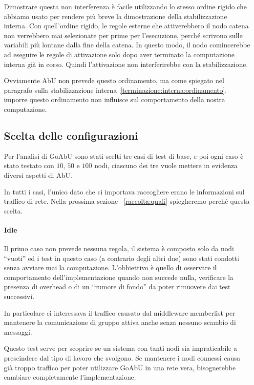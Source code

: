 \documentclass[12pt, a4paper]{article}
\begin{document}
Dimostrare questa non interferenza è facile utilizzando lo stesso ordine rigido che abbiamo usato per rendere più breve la dimostrazione della stabilizzazione interna. Con quell'ordine rigido, le regole esterne che attiverebbero il nodo catena non verrebbero mai selezionate per prime per l'esecuzione, perché scrivono sulle variabili più lontane dalla fine della catena.
In questo modo, il nodo comincerebbe ad eseguire le regole di attivazione solo dopo aver terminato la computazione interna già in corso. Quindi l'attivazione non interferirebbe con la stabilizzazione.

Ovviamente AbU non prevede questo ordinamento, ma come spiegato nel paragrafo sulla stabilizzazione interna~\ref{terminazione:interna:ordinamento}, imporre questo ordinamento non influisce sul comportamento della nostra computazione.

\subsection{Scelta delle configurazioni}

Per l'analisi di GoAbU sono stati scelti tre casi di test di base, e poi ogni caso è stato testato con $10$, $50$ e $100$ nodi, ciascuno dei tre vuole mettere in evidenza diversi aspetti di AbU.

In tutti i casi, l'unico dato che ci importava raccogliere erano le informazioni sul traffico di rete. Nella prossima sezione ~\ref{raccolta:quali} spiegheremo perché questa scelta.

\paragraph{Idle}

Il primo caso non prevede nessuna regola, il sistema è composto solo da nodi ``vuoti'' ed i test in questo caso (a contrario degli altri due) sono stati condotti senza avviare mai la computazione.
L'obbiettivo è quello di osservare il comportamento dell'implementazione quando non succede nulla, verificare la presenza di overhead o di un ``rumore di fondo'' da poter rimuovere dai test successivi.

In particolare ci interessava il traffico causato dal middleware memberlist per mantenere la comunicazione di gruppo attiva anche senza nessuno scambio di messaggi.

Questo test serve per scoprire se un sistema con tanti nodi sia impraticabile a prescindere dal tipo di lavoro che svolgono. Se mantenere i nodi connessi causa già troppo traffico per poter utilizzare GoAbU in una rete vera, bisognerebbe cambiare completamente l'implementazione.
\end{document}
